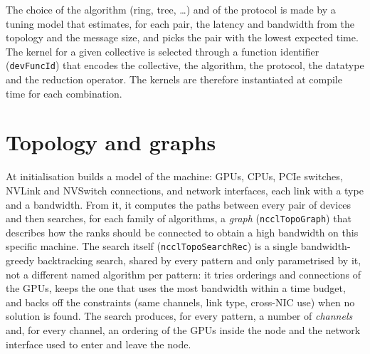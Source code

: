 The choice of the algorithm (ring, tree, \dots) and of the protocol is made by a tuning model that estimates, for each pair, the latency and bandwidth from the topology and the message size, and picks the pair with the lowest expected time.
The kernel for a given collective is selected through a function identifier (\texttt{devFuncId}) that encodes the collective, the algorithm, the protocol, the datatype and the reduction operator. The kernels are therefore instantiated at compile time for each combination.

\section{Topology and graphs}\label{sec:nccl-graph}

At initialisation \nccl{} builds a model of the machine: GPUs, CPUs, PCIe switches, NVLink and NVSwitch connections, and network interfaces, each link with a type and a bandwidth.
From it, it computes the paths between every pair of devices and then searches, for each family of algorithms, a \emph{graph} (\texttt{ncclTopoGraph}) that describes how the ranks should be connected to obtain a high bandwidth on this specific machine.
The search itself (\texttt{ncclTopoSearchRec}) is a single bandwidth-greedy backtracking search, shared by every pattern and only parametrised by it, not a different named algorithm per pattern: it tries orderings and connections of the GPUs, keeps the one that uses the most bandwidth within a time budget, and backs off the constraints (same channels, link type, cross-NIC use) when no solution is found.
The search produces, for every pattern, a number of \emph{channels} and, for every channel, an ordering of the GPUs inside the node and the network interface used to enter and leave the node.

